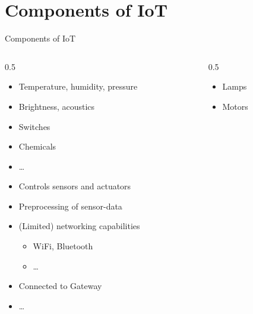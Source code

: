 ﻿

\nopartpage
\part{Components of IoT}
\withpartpage

\begin{frame}{Components of IoT}
  \begin{columns}[onlytextwidth]
    \begin{column}[T]{0.5\textwidth}
      \begin{description}[Microcontroller]
        \item[Sensors]
        \begin{itemize}
          \item Temperature, humidity, pressure
          \item Brightness, acoustics
          \item Switches
          \item Chemicals
          \item \ldots
        \end{itemize}
        \item[Microcontroller]
        \begin{itemize}
          \item Controls sensors and actuators
          \item Preprocessing of sensor-data
          \item (Limited) networking capabilities
          \begin{itemize}
            \item WiFi, Bluetooth
            \item \ldots
          \end{itemize}
          \item Connected to Gateway
          \item \ldots
        \end{itemize}
      \end{description}
    \end{column}
    \begin{column}[T]{0.5\textwidth}
      \begin{description}[Actuators]
        \item[Actuators]
        \begin{itemize}
          \item Lamps
          \item Motors

\end{itemize}
\end{description}
\end{column}
\end{columns}
\end{frame}

